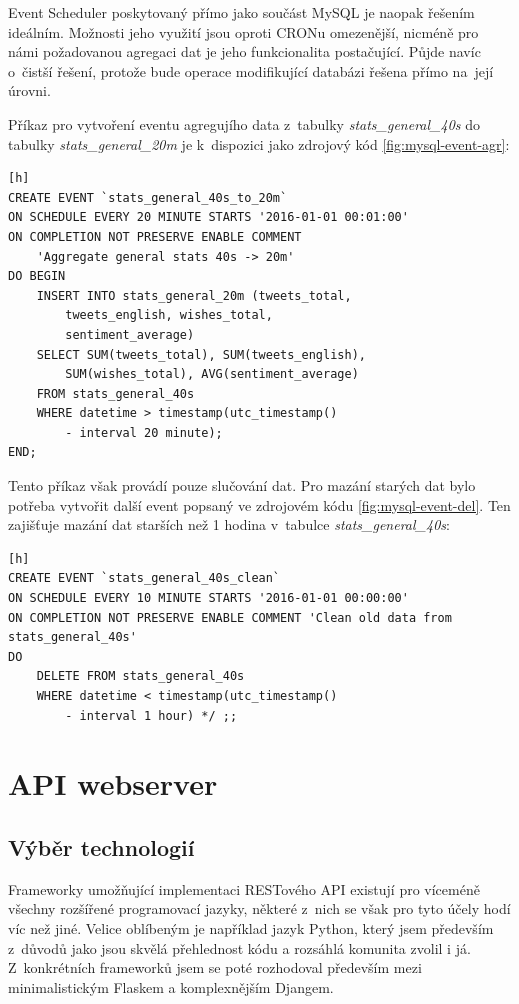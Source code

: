 \documentclass[thesis=B,czech]{FITthesis}[2012/06/26]
\begin{document}
	Event Scheduler\cite{event-scheduler} poskytovaný přímo jako součást MySQL je naopak řešením ideálním. Možnosti jeho využití jsou oproti CRONu omezenější, nicméně pro námi požadovanou agregaci dat je jeho funkcionalita postačující. Půjde navíc o~čistší řešení, protože bude operace modifikující databázi řešena přímo na~její úrovni. 
	
	Příkaz pro vytvoření eventu agregujího data z~tabulky \textit{stats\_general\_40s} do tabulky \textit{stats\_general\_20m} je k~dispozici jako zdrojový kód \ref{fig:mysql-event-agr}:

\begin{lstlisting}[caption={MySQL Event provádějící agregaci dat},label=fig:mysql-event-agr][h]
CREATE EVENT `stats_general_40s_to_20m` 
ON SCHEDULE EVERY 20 MINUTE STARTS '2016-01-01 00:01:00' 
ON COMPLETION NOT PRESERVE ENABLE COMMENT 
	'Aggregate general stats 40s -> 20m' 
DO BEGIN 
	INSERT INTO stats_general_20m (tweets_total, 
		tweets_english, wishes_total, 
		sentiment_average) 
	SELECT SUM(tweets_total), SUM(tweets_english), 
		SUM(wishes_total), AVG(sentiment_average) 
	FROM stats_general_40s 
	WHERE datetime > timestamp(utc_timestamp() 
		- interval 20 minute); 
END;
\end{lstlisting}


Tento příkaz však provádí pouze slučování dat. Pro mazání starých dat bylo potřeba vytvořit další event popsaný ve zdrojovém kódu \ref{fig:mysql-event-del}. Ten zajišťuje mazání dat starších než 1 hodina v~tabulce \textit{stats\_general\_40s}:

\begin{lstlisting}[caption={MySQL Event provádějící smazání starých dat},label=fig:mysql-event-del][h]
CREATE EVENT `stats_general_40s_clean` 
ON SCHEDULE EVERY 10 MINUTE STARTS '2016-01-01 00:00:00' 
ON COMPLETION NOT PRESERVE ENABLE COMMENT 'Clean old data from stats_general_40s' 
DO 
	DELETE FROM stats_general_40s
	WHERE datetime < timestamp(utc_timestamp() 
		- interval 1 hour) */ ;;
\end{lstlisting}

\section{API webserver}
\subsection{Výběr technologií}
	Frameworky umožňující implementaci RESTového API existují pro víceméně všechny rozšířené programovací jazyky, některé z~nich se však pro tyto účely hodí víc než jiné. Velice oblíbeným je například jazyk Python, který jsem především z~důvodů jako jsou skvělá přehlednost kódu a rozsáhlá komunita zvolil i já. Z~konkrétních frameworků jsem se poté rozhodoval především mezi minimalistickým Flaskem\cite{flask} a komplexnějším Djangem\cite{django}. 
	
\end{document}
